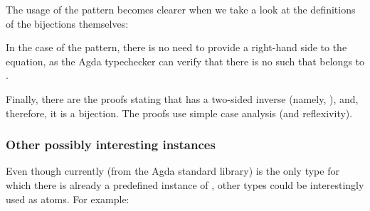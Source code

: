             The usage of the  pattern becomes clearer when we take a look at
            the definitions of the bijections themselves:

            \begin{center}
            \end{center}

            In the case of the  pattern, there is no need to provide a right-hand side
            to the equation, as the Agda typechecker can verify that
            there is no  such that  \AY{(} \AY{)} belongs to  .

            Finally, there are the proofs stating that  has a two-sided inverse (namely, ),
            and, therefore, it is a bijection. The proofs use simple case analysis (and reflexivity).

            \begin{center}
            \end{center}

            \subsubsection{Other possibly interesting instances}
            Even though currently  (from the Agda standard library) is the only type for which
            there is already a predefined instance of , other types could be interestingly used as atoms.
            For example:

